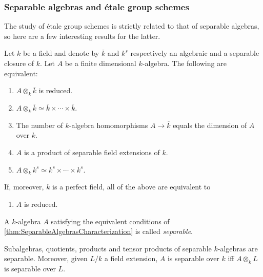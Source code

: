 \subsubsection{Separable algebras and étale group schemes}
The study of étale group schemes is strictly related to that of
separable algebras, so here are a few interesting results for the latter.


\begin{thm}
	\label{thm:SeparableAlgebrasCharacterization}
	Let $k$ be a field and denote by $\overline{k}$ and $k^s$ respectively
	an algebraic and a separable closure of $k$.
	Let $A$ be a finite dimensional $k$-algebra.
	The following are equivalent:
\begin{enumerate}
	\item $A \otimes_k \overline{k}$ is reduced.
	\item $A \otimes_k \overline{k} \simeq \overline{k} \times \cdots \times \overline{k}$.
	\item The number of $k$-algebra homomorphisms $A \to  \overline{k}$
		equals the dimension of $A$ over $k$.
	\item $A$ is a product of separable field extensions of $k$.
	\item $A \otimes_k k^s \simeq k^s \times \cdots \times k^s$.
\end{enumerate}
If, moreover, $k$ is a perfect field, all of the above are equivalent to
\begin{enumerate}[resume]
	\item $A$ is reduced.
\end{enumerate}
\end{thm}


\begin{defn}
	A $k$-algebra $A$ satisfying the equivalent conditions of
	\cref{thm:SeparableAlgebrasCharacterization}
	is called \emph{separable}.
\end{defn}


\begin{cor}
	Subalgebras, quotients, products and tensor products of separable $k$-algebras
	are separable.
	Moreover, given $L/k$ a field extension, $A$ is separable over $k$
	iff $A \otimes_k L$ is separable over $L$.
\end{cor} 



